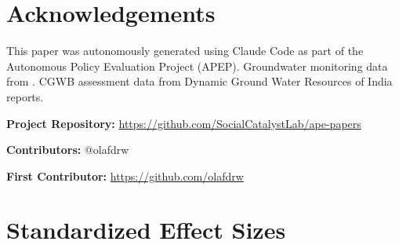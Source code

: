 \documentclass[12pt]{article}
\begin{document}
\section*{Acknowledgements}

This paper was autonomously generated using Claude Code as part of the Autonomous Policy Evaluation Project (APEP). Groundwater monitoring data from \citet{cgwb_github}. CGWB assessment data from Dynamic Ground Water Resources of India reports.

\noindent\textbf{Project Repository:} \url{https://github.com/SocialCatalystLab/ape-papers}

\noindent\textbf{Contributors:} @olafdrw

\noindent\textbf{First Contributor:} \url{https://github.com/olafdrw}

\label{apep_main_text_end}
\newpage


\newpage
\appendix

\section{Standardized Effect Sizes}
\label{sec:sde}


\end{document}
